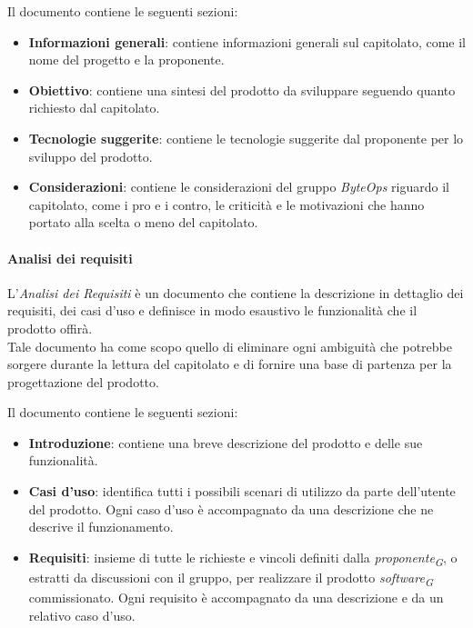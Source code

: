 Il documento contiene le seguenti sezioni:
\begin{itemize}
    \item \textbf{Informazioni generali}: contiene informazioni generali sul capitolato, come il nome del progetto e la proponente.
    \item \textbf{Obiettivo}: contiene una sintesi del prodotto da sviluppare seguendo quanto richiesto dal capitolato.
    \item \textbf{Tecnologie suggerite}: contiene le tecnologie suggerite dal proponente per lo sviluppo del prodotto.
    \item \textbf{Considerazioni}: contiene le considerazioni del gruppo \textit{ByteOps} riguardo il capitolato, come i pro e i contro, le criticità e le motivazioni che hanno portato alla scelta o meno del capitolato.
\end{itemize}

\paragraph{Analisi dei requisiti}
L'\textit{Analisi dei Requisiti} è un documento che contiene la descrizione in dettaglio dei requisiti, dei casi d'uso e definisce in modo esaustivo le funzionalità che il prodotto offirà.\\
Tale documento ha come scopo quello di eliminare ogni ambiguità che potrebbe sorgere durante la lettura del capitolato e di fornire una base di partenza per la progettazione del prodotto.

Il documento contiene le seguenti sezioni:

\begin{itemize}
    \item \textbf{Introduzione}: contiene una breve descrizione del prodotto e delle sue funzionalità.
    \item \textbf{Casi d'uso}: identifica tutti i possibili scenari di utilizzo da parte dell'utente del prodotto. Ogni caso d'uso è accompagnato da una descrizione che ne descrive il funzionamento.
    \item \textbf{Requisiti}: insieme di tutte le richieste e vincoli definiti dalla \textit{proponente}\textsubscript{\textit{G}}, o estratti da discussioni con il gruppo, per realizzare il prodotto \textit{software}\textsubscript{\textit{G}} commissionato. Ogni requisito è accompagnato da una descrizione e da un relativo caso d'uso. 
\end{itemize}

